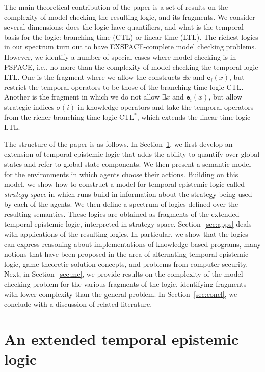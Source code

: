 \documentclass[a4wide]{article}
\newcommand{\LTL}{\mbox{LTL}}
\newcommand{\CTL}{\mbox{CTL}}
\newcommand{\CTLs}{\mbox{CTL$^*$}}
\theoremstyle{examplesty}
\newcommand{\strat}{\sigma}
\newcommand{\lid}[2]{\mathtt{e}_{#1}(#2)}
\begin{document}
The main theoretical contribution of the paper is a set of results on the complexity of model checking the 
resulting logic, and its fragments. 
We consider several dimensions: does the logic have 
quantifiers, and what is the temporal basis for the logic: branching-time (CTL) or 
linear time (LTL). The richest logics in our spectrum turn out to have 
EXSPACE-complete model checking problems. 
However, we identify a 
number of special cases where model checking is in PSPACE, 
i.e., no more than the complexity of model checking the temporal logic LTL. 
One is the fragment where we allow the constructs $\exists x$ and $\lid{i}{x}$, but 
restrict the temporal operators to be those of the branching-time logic $\CTL$. 
Another is the fragment in which we do not allow $\exists x$ and $\lid{i}{x}$, 
but allow strategic indices $\strat(i)$ in knowledge operators and 
take the temporal operators from the richer branching-time logic $\CTLs$, which extends 
the linear time logic $\LTL$.


The structure of the paper is as follows. 
In Section~\ref{sec:etl}, we first develop an extension of temporal epistemic logic that adds the
ability to quantify over global states and refer to global state components. 
We then present a semantic model 
for the environments in which 
agents choose their actions. Building on this model, we show how 
to construct a model  for temporal epistemic logic 
called {\em strategy space} 
in which runs build 
in information 
about the strategy being used by each of the agents. 
We then define a spectrum of logics defined over the resulting semantics. 
These logics are obtained as fragments of the extended temporal epistemic logic, interpreted in 
 strategy space. 
Section~\ref{sec:apps} deals with applications of the resulting logics. 
In particular, we show that the logics can express reasoning about 
implementations of knowledge-based programs, 
many notions that have been proposed in the area of 
alternating temporal epistemic logic, game theoretic solution 
concepts, and problems from computer security. 
Next, in Section~\ref{sec:mc}, we provide results on the complexity of the model checking problem for the 
various fragments of the logic, identifying fragments with lower complexity than the general problem.  
In Section~\ref{sec:concl}, we conclude with a discussion of related literature. 



\section{An extended temporal epistemic logic}\label{sec:etl}
\end{document}
